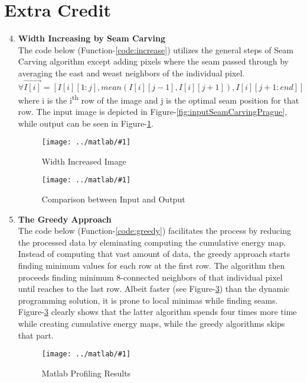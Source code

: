 \documentclass{article}
\newcommand{\listFigure}[3]{ \begin{figure}[H]
\texttt{[image: ../matlab/\#1]}
		\caption{#2\label{fig:#3}}
	\end{figure}		
}
\begin{document}
\section{Extra Credit}
\begin{enumerate}
	\setcounter{enumi}{3}
	\item \textbf{Width Increasing by Seam Carving} \\
	The code below (Function-\ref{code:increase}) utilizes the general steps of
	Seam Carving algorithm except adding pixels where the seam passed through by averaging the east and weast
	neighbors of the individual pixel.
	$$\forall\vec{I[i]} = [I[i][1:j], mean(I[i][j-1],I[i][j+1]),
	I[i][j+1:end]]$$
	where i is the i\textsuperscript{th} row of the image
	and j is the optimal seam position for that row. The input image is depicted in
	Figure-\ref{fig:inputSeamCarvingPrague}, while output can be seen in
	Figure-\ref{fig:increaseWidth}.
	\label{code:increase}
	
	\listFigure{increaseWidth.png}{Width
	Increased Image}{increaseWidth} 
	\listFigure{outputIncreaseWidthComparisonOutputsPrague.png}{Comparison
	between Input and Output}{outputIncreaseWidthComparisonOutputsPrague}
	\item \textbf{The Greedy Approach} \\
	The code below (Function-\ref{code:greedy}) facilitates the process by reducing
	the processed data by eleminating computing the cumulative energy map. Instead
	of computing that vast amount of data, the greedy approach starts finding
	minimum values for each row at the first row. The algorithm then proceeds
	finding minimum 8-connected neighbors of that individual pixel until reaches to
	the last row.
	Albeit faster (see Figure-\ref{fig:profile}) than the dynamic programming
	solution, it is prone to local minimas while finding seams.
	Figure-\ref{fig:profile} clearly shows that the latter algorithm spends four
	times more time while creating cumulative energy maps, while the greedy
	algorithms skips that part.
	\listFigure{profile.png}{Matlab Profiling Results}{profile}
	\label{code:greedy}
	
\end{enumerate}
\end{document}
